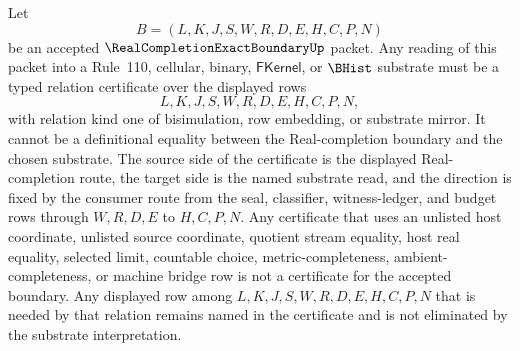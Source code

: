 \begin{theorem}
\label{thm:real-completion-exact-boundary-substrate-relation-boundary}
Let
$$
B=(L,K,J,S,W,R,D,E,H,C,P,N)
$$
be an accepted $\RealCompletionExactBoundaryUp$ packet. Any reading of this packet into a Rule~110, cellular, binary, $\mathsf{FKernel}$, or $\BHist$ substrate must be a typed relation certificate over the displayed rows
$$
L,K,J,S,W,R,D,E,H,C,P,N,
$$
with relation kind one of bisimulation, row embedding, or substrate mirror. It cannot be a definitional equality between the Real-completion boundary and the chosen substrate. The source side of the certificate is the displayed Real-completion route, the target side is the named substrate read, and the direction is fixed by the consumer route from the seal, classifier, witness-ledger, and budget rows through $W,R,D,E$ to $H,C,P,N$. Any certificate that uses an unlisted host coordinate, unlisted source coordinate, quotient stream equality, host real equality, selected limit, countable choice, metric-completeness, ambient-completeness, or machine bridge row is not a certificate for the accepted boundary. Any displayed row among $L,K,J,S,W,R,D,E,H,C,P,N$ that is needed by that relation remains named in the certificate and is not eliminated by the substrate interpretation.
\end{theorem}
